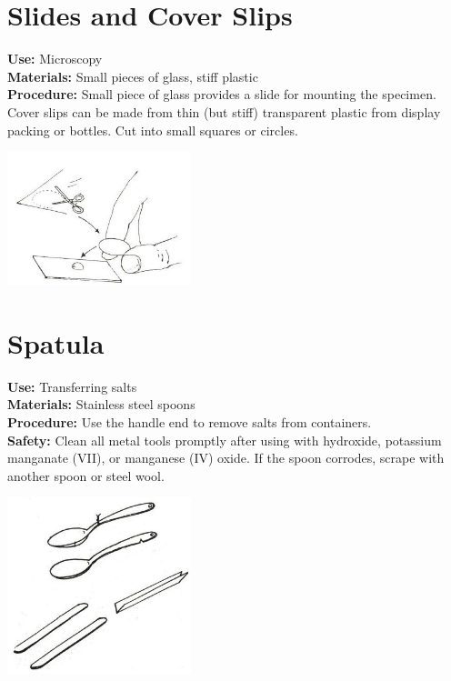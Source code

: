 \begin{multicols}{2}
\section{Slides and Cover Slips}
\label{sec:slide-cover-slip}
\vspace{-10pt}
\textbf{Use:} Microscopy\\
\textbf{Materials:} Small pieces of glass, stiff plastic\\
\textbf{Procedure:} Small piece of glass provides a slide for mounting the
specimen. Cover slips can be made
from thin (but stiff) transparent plastic from
display packing or bottles. Cut into small squares or circles.
\begin{center}
\includegraphics[width=0.4\textwidth]{./img/source/slide-cover-slip.jpg}
\end{center}

\section{Spatula}
\label{sec:spatula}
\vspace{-10pt}
\textbf{Use:} Transferring salts\\
\textbf{Materials:} Stainless steel spoons\\
\textbf{Procedure:} Use the handle end to remove salts from containers.\\
\textbf{Safety:} Clean all metal tools promptly after using with hydroxide, 
potassium manganate (VII), 
or manganese (IV) oxide. 
If the spoon corrodes, scrape with another spoon or steel wool.
\begin{center}
\includegraphics[width=0.4\textwidth]{./img/source/spatula.jpg}
\end{center}


\end{multicols}
